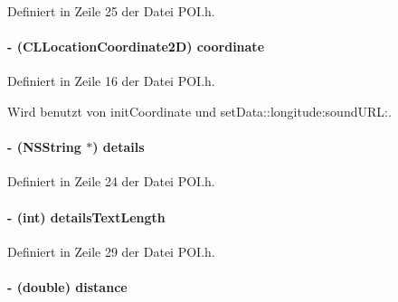 Definiert in Zeile 25 der Datei POI.h.\hypertarget{interface_p_o_i_a63afb07b66c43a26aa58ab7759c4f473}{
\paragraph[{coordinate}]{\setlength{\rightskip}{0pt plus 5cm}-\/ (CLLocationCoordinate2D) coordinate}\hfill}
\label{interface_p_o_i_a63afb07b66c43a26aa58ab7759c4f473}


Definiert in Zeile 16 der Datei POI.h.

Wird benutzt von initCoordinate und setData::longitude:soundURL:.\hypertarget{interface_p_o_i_a0b6bb6f1128c8cf4af2edd5fd47940fe}{
\paragraph[{details}]{\setlength{\rightskip}{0pt plus 5cm}-\/ (NSString $\ast$) details}\hfill}
\label{interface_p_o_i_a0b6bb6f1128c8cf4af2edd5fd47940fe}


Definiert in Zeile 24 der Datei POI.h.\hypertarget{interface_p_o_i_a22b3633a4bf768953ce7865cefa5430d}{
\paragraph[{detailsTextLength}]{\setlength{\rightskip}{0pt plus 5cm}-\/ (int) detailsTextLength}\hfill}
\label{interface_p_o_i_a22b3633a4bf768953ce7865cefa5430d}


Definiert in Zeile 29 der Datei POI.h.\hypertarget{interface_p_o_i_a90eb704b40c5beca89e7461f3c9fd8ff}{
\paragraph[{distance}]{\setlength{\rightskip}{0pt plus 5cm}-\/ (double) distance}\hfill}
\label{interface_p_o_i_a90eb704b40c5beca89e7461f3c9fd8ff}


